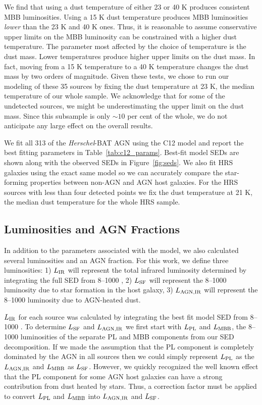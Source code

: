 \documentclass[fleqn, usenatbib]{mnras}
\newcommand{\herschel}{\emph{Herschel}}
\begin{document}
We find that using a dust temperature of either 23 or 40 K produces consistent MBB luminosities. Using a 15 K dust temperature produces MBB luminosities \textit{lower} than the 23 K and 40 K ones. Thus, it is reasonable to assume conservative upper limits on the MBB luminosity can be constrained with a higher dust temperature. The parameter most affected by the choice of temperature is the dust mass. Lower temperatures produce higher upper limits on the dust mass. In fact, moving from a 15 K temperature to a 40 K temperature changes the dust mass by two orders of magnitude. Given these tests, we chose to run our modeling of these 35 sources by fixing the dust temperature at 23 K, the median temperature of our whole sample. We acknowledge that for some of the undetected sources, we might be underestimating the upper limit on the dust mass. Since this subsample is only $\sim10$ per cent of the whole, we do not anticipate any large effect on the overall results.

We fit all 313 of the \herschel-BAT AGN using the C12 model and report the best fitting parameters in Table~\ref{tab:c12_params}. Best-fit model SEDs are shown along with the observed SEDs in Figure~\ref{fig:seds}. We also fit HRS galaxies using the exact same model so we can accurately compare the star-forming properties between non-AGN and AGN host galaxies. For the HRS sources with less than four detected points we fix the dust temperature at 21 K, the median dust temperature for the whole HRS sample. 

\subsection{Luminosities and AGN Fractions}
In addition to the parameters associated with the model, we also calculated several luminosities and an AGN fraction. For this work, we define three luminosities: 1) $L_{\rm IR}$ will represent the total infrared luminosity determined by integrating the full SED from 8--1000 \micron, 2) $L_{\rm SF}$ will represent the 8--1000 \micron{} luminosity due to star formation in the host galaxy, 3) $L_{\rm AGN, IR}$ will represent the 8--1000 \micron{} luminosity due to AGN-heated dust. 

 $L_{\rm IR}$ for each source was calculated by integrating the best fit model SED from 8--1000 \micron. To determine $L_{\rm SF}$ and $L_{\rm AGN, IR}$ we first start with $L_{\rm PL}$ and $L_{\rm MBB}$, the 8--1000 \micron{} luminosities of the separate PL and MBB components from our SED decomposition. If we made the assumption that the PL component is completely dominated by the AGN in all sources then we could simply represent $L_{\rm PL}$ as the $L_{\rm AGN, IR}$ and $L_{\rm MBB}$ as $L_{\rm SF}$. However, we quickly recognized the well known effect that the PL component for some AGN host galaxies can have a strong contribution from dust heated by stars. Thus, a correction factor must be applied to convert $L_{\rm PL}$ and $L_{\rm MBB}$ into $L_{\rm AGN, IR}$ and $L_{\rm SF}$.
\end{document}
